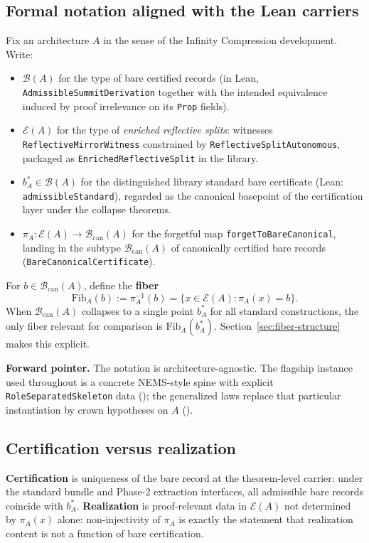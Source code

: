 \documentclass[11pt]{article}
\begin{document}
\subsection{Formal notation aligned with the Lean carriers}\label{sec:framework-notation}
Fix an architecture $A$ in the sense of the Infinity Compression development. Write:
\begin{itemize}
    \item $\mathcal{B}(A)$ for the type of bare certified records (in Lean, \texttt{AdmissibleSummitDerivation} together with the intended equivalence induced by proof irrelevance on its \texttt{Prop} fields).
    \item $\mathcal{E}(A)$ for the type of \emph{enriched reflective splits}: witnesses \texttt{ReflectiveMirrorWitness} constrained by \texttt{ReflectiveSplitAutonomous}, packaged as \texttt{EnrichedReflectiveSplit} in the library.
    \item $b^\ast_A \in \mathcal{B}(A)$ for the distinguished library standard bare certificate (Lean: \texttt{admissibleStandard}), regarded as the canonical basepoint of the certification layer under the collapse theorems.
    \item $\pi_A : \mathcal{E}(A) \to \mathcal{B}_{\mathrm{can}}(A)$ for the forgetful map \texttt{forgetToBareCanonical}, landing in the subtype $\mathcal{B}_{\mathrm{can}}(A)$ of canonically certified bare records (\texttt{BareCanonicalCertificate}).
\end{itemize}
For $b \in \mathcal{B}_{\mathrm{can}}(A)$, define the \textbf{fiber}
\[
  \mathrm{Fib}_A(b) := \pi_A^{-1}(b) = \{ x \in \mathcal{E}(A) : \pi_A(x) = b \}.
\]
When $\mathcal{B}_{\mathrm{can}}(A)$ collapses to a single point $b^\ast_A$ for all standard constructions, the only fiber relevant for comparison is $\mathrm{Fib}_A(b^\ast_A)$. Section~\ref{sec:fiber-structure} makes this explicit.

\smallskip
\noindent\textbf{Forward pointer.} The notation is architecture-agnostic. The flagship instance used throughout is a concrete NEMS-style spine with explicit \texttt{RoleSeparatedSkeleton} data (); the generalized laws replace that particular instantiation by crown hypotheses on $A$ ().

\subsection{Certification versus realization}\label{sec:framework-cert-vs-real}
\textbf{Certification} is uniqueness of the bare record at the theorem-level carrier: under the standard bundle and Phase-2 extraction interfaces, all admissible bare records coincide with $b^\ast_A$. \textbf{Realization} is proof-relevant data in $\mathcal{E}(A)$ not determined by $\pi_A(x)$ alone: non-injectivity of $\pi_A$ is exactly the statement that realization content is not a function of bare certification.
\end{document}
